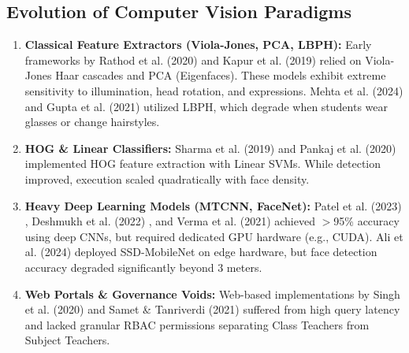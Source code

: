 \documentclass[10pt,journal,compsoc,twocolumn,a4paper]{IEEEtran}
\begin{document}
\subsection{Evolution of Computer Vision Paradigms}
\begin{enumerate}
    \item \textbf{Classical Feature Extractors (Viola-Jones, PCA, LBPH):} Early frameworks by Rathod et al. (2020) \cite{ref1} and Kapur et al. (2019) \cite{ref4} relied on Viola-Jones Haar cascades and PCA (Eigenfaces). These models exhibit extreme sensitivity to illumination, head rotation, and expressions. Mehta et al. (2024) \cite{ref11} and Gupta et al. (2021) \cite{ref15} utilized LBPH, which degrade when students wear glasses or change hairstyles.
    \item \textbf{HOG \& Linear Classifiers:} Sharma et al. (2019) \cite{ref5} and Pankaj et al. (2020) \cite{ref17} implemented HOG feature extraction with Linear SVMs. While detection improved, execution scaled quadratically with face density.
    \item \textbf{Heavy Deep Learning Models (MTCNN, FaceNet):} Patel et al. (2023) \cite{ref2}, Deshmukh et al. (2022) \cite{ref3}, and Verma et al. (2021) \cite{ref18} achieved $>$95\% accuracy using deep CNNs, but required dedicated GPU hardware (e.g., CUDA). Ali et al. (2024) \cite{ref20} deployed SSD-MobileNet on edge hardware, but face detection accuracy degraded significantly beyond 3 meters.
    \item \textbf{Web Portals \& Governance Voids:} Web-based implementations by Singh et al. (2020) \cite{ref7} and Samet \& Tanriverdi (2021) \cite{ref8} suffered from high query latency and lacked granular RBAC permissions separating Class Teachers from Subject Teachers.
\end{enumerate}
\end{document}
